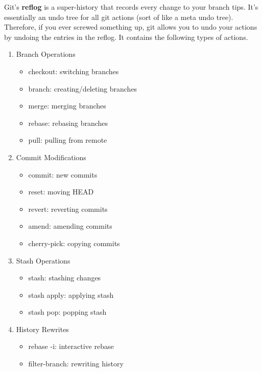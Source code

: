 \documentclass{article}
\begin{document}
    \begin{definition}[Reflog]
      Git's \textbf{reflog} is a super-history that records every change to your branch tips. It's essentially an undo tree for all git actions (sort of like a meta undo tree). Therefore, if you ever screwed something up, git allows you to undo your actions by undoing the entries in the reflog. It contains the following types of actions. 
      \begin{enumerate}
        \item Branch Operations
          \begin{itemize}
            \item checkout: switching branches
            \item branch: creating/deleting branches
            \item merge: merging branches
            \item rebase: rebasing branches
            \item pull: pulling from remote
          \end{itemize}
        
        \item Commit Modifications
          \begin{itemize}
            \item commit: new commits
            \item reset: moving HEAD
            \item revert: reverting commits
            \item amend: amending commits
            \item cherry-pick: copying commits
          \end{itemize}

        \item Stash Operations
          \begin{itemize}
            \item stash: stashing changes
            \item stash apply: applying stash
            \item stash pop: popping stash
          \end{itemize}

        \item History Rewrites
          \begin{itemize}
            \item rebase -i: interactive rebase
            \item filter-branch: rewriting history
          \end{itemize}


\end{enumerate}
\end{definition}
\end{document}
